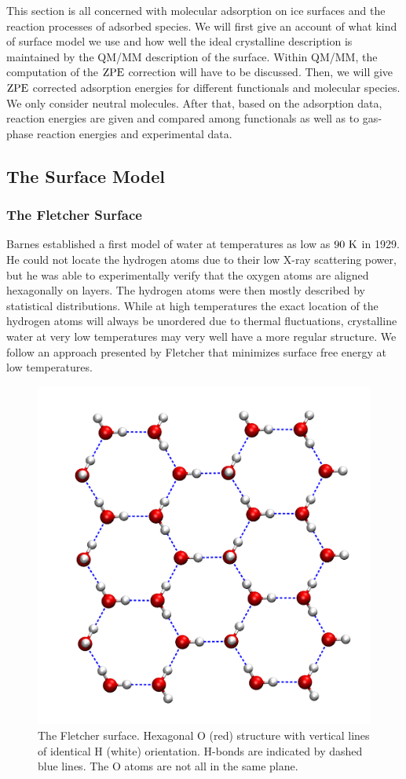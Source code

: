 \documentclass[8.5pt,twoside,twocolumn]{article}
\newcommand\zpe{\enmat{\te{ZPE}}}
\renewcommand\K{{\enmat{~\te{K}}}}
\theoremstyle{standard}
\begin{document}
This section is all concerned with molecular adsorption on ice surfaces
and the reaction processes of adsorbed species. We will first give an
account of what kind of surface model we use and how well the ideal
crystalline description is maintained by the QM/MM description of
the surface. Within QM/MM, the computation of the $\zpe$ correction 
will have to be discussed. Then, we will give $\zpe$ corrected adsorption
energies for different functionals and molecular species. We only consider
neutral molecules.
After that, based on the adsorption data, reaction energies are given
and compared among functionals as well as to gas-phase reaction
energies and experimental data.

\subsection{The Surface Model}
\label{Sec:Ads:Model}

\subsubsection{The Fletcher Surface}
Barnes \cite{Barnes1929} established a first model of water at temperatures
as low as $90\K$ in 1929. He could not locate the hydrogen atoms due
to their low X-ray scattering power\cite{Fletcher1966}, but he was able
to experimentally verify that the oxygen atoms are aligned hexagonally
on layers. The hydrogen atoms were then mostly described by statistical
distributions. While at high temperatures the exact location of the hydrogen
atoms will always be unordered due to thermal fluctuations, crystalline
water at very low temperatures may very well have a more regular structure.
We follow an approach presented by Fletcher\cite{Fletcher1992} that minimizes
surface free energy at low temperatures.

\begin{figure}[ht]
\includegraphics[width=.48\textwidth]{./img/FletcherAboveGlossyNoCueing.png}
\caption{The Fletcher surface. Hexagonal O (red) structure with vertical lines 
of identical H (white) orientation. H-bonds are indicated by dashed blue lines.
The O atoms are not all in the same plane.}
\label{Fig:Ads:Fletcher}
\end{figure}
\end{document}
